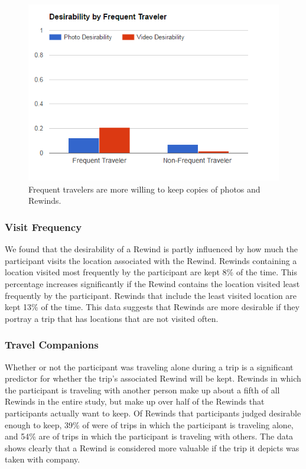 \documentclass{sigchi}
\begin{document}
\begin{figure}
   \centering
     \includegraphics[width=1\linewidth]{FreqTraveler_keep_2}
     \caption{Frequent travelers are more willing to keep copies of photos and Rewinds.}
     \label{fig:frequencydesire}
\end{figure}

\subsubsection{Visit Frequency}
We found that the desirability of a Rewind is partly influenced by how much the participant visits the location associated with the Rewind. Rewinds containing a location visited most frequently by the participant are kept 8\% of the time. This percentage increases significantly if the Rewind contains the location visited least frequently by the participant. Rewinds that include the least visited location are kept 13\% of the time. This data suggests that Rewinds are more desirable if they portray a trip that has locations that are not visited often.

\subsubsection{Travel Companions}
Whether or not the participant was traveling alone during a trip is a significant predictor for whether the trip's associated Rewind will be kept. Rewinds in which the participant is traveling with another person make up about a fifth of all Rewinds in the entire study, but make up over half of the Rewinds that participants actually want to keep. Of Rewinds that participants judged desirable enough to keep, 39\% of were of trips in which the participant is traveling alone, and 54\% are of trips in which the participant is traveling with others. The data shows clearly that a Rewind is considered more valuable if the trip it depicts was taken with company. 
\end{document}
